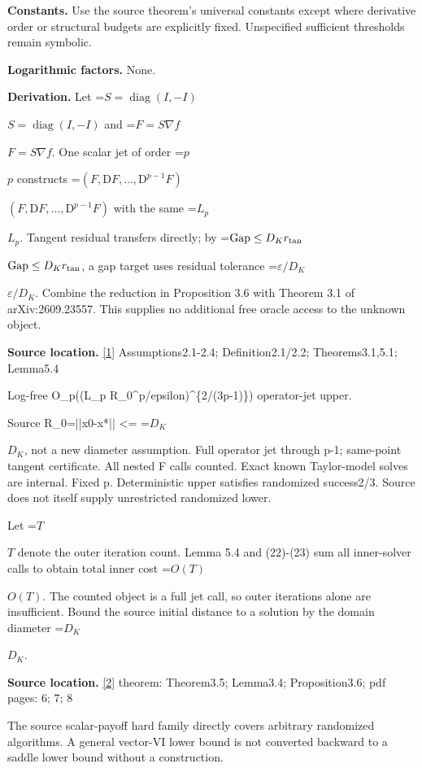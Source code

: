 \documentclass[10pt,a4paper]{article}
\newcommand{\AtlasMath}[1]{\par\begingroup\centering\setbox0=\hbox{$\displaystyle #1$}\ifdim\wd0>1.4\linewidth\typeout{ATLAS WIDE FORMULA: \the\wd0}\fi\ifdim\wd0>\linewidth\resizebox{\linewidth}{!}{\box0}\else\box0\fi\par\endgroup}
\newcommand{\AtlasInlineMath}[1]{\begingroup\setbox0=\hbox{$#1$}\ifdim\wd0>.4\linewidth\endgroup\AtlasMath{#1}\else\endgroup$#1$\fi}
\begin{document}
\textbf{Constants.} Use the source theorem’s universal constants except where derivative order or structural budgets are explicitly fixed. Unspecified sufficient thresholds remain symbolic.



\textbf{Logarithmic factors.} None.



\textbf{Derivation.} Let \AtlasInlineMath{S=\operatorname{diag}(I,-I)} and \AtlasInlineMath{F=S\nabla f}. One scalar jet of order \AtlasInlineMath{p} constructs \AtlasInlineMath{(F,\mathrm DF,\ldots,\mathrm D^{p-1}F)} with the same \AtlasInlineMath{L_p}. Tangent residual transfers directly; by \AtlasInlineMath{\operatorname{Gap}\le D_K r_{\rm tan}}, a gap target uses residual tolerance \AtlasInlineMath{\varepsilon/D_K}. Combine the reduction in Proposition 3.6 with Theorem 3.1 of arXiv:2609.23557. This supplies no additional free oracle access to the unknown object.



\textbf{Source location.} \href{https://arxiv.org/pdf/2609.23557v1}{[1]} Assumptions2.1-2.4; Definition2.1/2.2; Theorems3.1,5.1; Lemma5.4



Log-free O\_p((L\_p R\_0\textasciicircum{}p/epsilon)\textasciicircum{}\{2/(3p-1)\}) operator-jet upper.



Source R\_0=||x0-x*|| <= \AtlasInlineMath{D_K}, not a new diameter assumption. Full operator jet through p-1; same-point tangent certificate. All nested F calls counted. Exact known Taylor-model solves are internal. Fixed p. Deterministic upper satisfies randomized success2/3. Source does not itself supply unrestricted randomized lower.



Let \AtlasInlineMath{T} denote the outer iteration count. Lemma 5.4 and (22)-(23) sum all inner-solver calls to obtain total inner cost \AtlasInlineMath{O(T)}. The counted object is a full jet call, so outer iterations alone are insufficient. Bound the source initial distance to a solution by the domain diameter \AtlasInlineMath{D_K}.



\textbf{Source location.} \href{https://arxiv.org/pdf/2609.28246v2}{[2]} theorem: Theorem3.5; Lemma3.4; Proposition3.6; pdf pages: 6; 7; 8



The source scalar-payoff hard family directly covers arbitrary randomized algorithms. A general vector-VI lower bound is not converted backward to a saddle lower bound without a construction.
\end{document}
